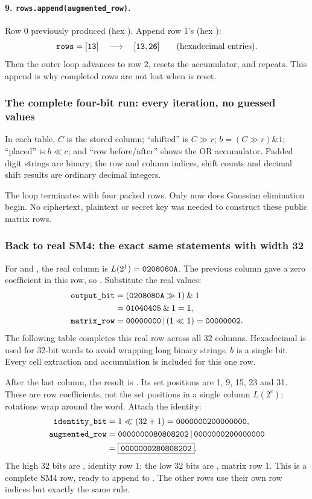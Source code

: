 \paragraph{9. \texttt{rows.append(augmented\_row)}.}
Row 0 previously produced  (hex ). Append row 1's
 (hex ):
\[
\texttt{rows}=[\texttt{13}]\quad\longrightarrow\quad[\texttt{13},\texttt{26}]
\qquad\text{(hexadecimal entries)}.
\]
Then the outer loop advances to row 2, resets the accumulator, and repeats.
This append is why completed rows are not lost when  is reset.

\subsubsection*{The complete four-bit run: every iteration, no guessed values}
In each table, $C$ is the stored column; ``shifted'' is $C\gg r$;
$b=(C\gg r)\mathbin{\&}1$; ``placed'' is $b\ll c$; and ``row before/after''
shows the OR accumulator. Padded digit strings are binary; the row and column
indices, shift counts and decimal shift results are ordinary decimal integers.


The loop terminates with four packed rows. Only now does Gaussian elimination
begin. No ciphertext, plaintext or secret key was needed to construct these
public matrix rows.

\subsubsection*{Back to real SM4: the exact same statements with width 32}
For  and , the real column is
$L(2^1)=\texttt{0208080A}$. The previous column gave a zero coefficient in this row,
so . Substitute the real values:
\[
\begin{aligned}
\texttt{output\_bit}&=(\texttt{0208080A}\gg1)\mathbin{\&}1\\
&=\texttt{01040405}\mathbin{\&}1=1,\\
\texttt{matrix\_row}&=\texttt{00000000}\,|\,(1\ll1)=\texttt{00000002}.
\end{aligned}
\]
The following table completes this real row across all 32 columns. Hexadecimal
is used for 32-bit words to avoid wrapping long binary strings; $b$ is a single
bit. Every cell extraction and accumulation is included for this one row.

After the last column, the result is . Its set positions are
1, 9, 15, 23 and 31. These are row coefficients, not the set positions in a
single column $L(2^c)$; rotations wrap around the word. Attach the identity:
\[
\begin{aligned}
\texttt{identity\_bit}&=1\ll(32+1)=\texttt{0000000200000000},\\
\texttt{augmented\_row}&=\texttt{0000000080808202}\,|\,\texttt{0000000200000000}\\
&=\boxed{\texttt{0000000280808202}}.
\end{aligned}
\]
The high 32 bits are , identity row 1; the low 32 bits are
, matrix row 1. This is a complete SM4 row, ready to append to
. The other rows use their own row indices but exactly the same rule.
